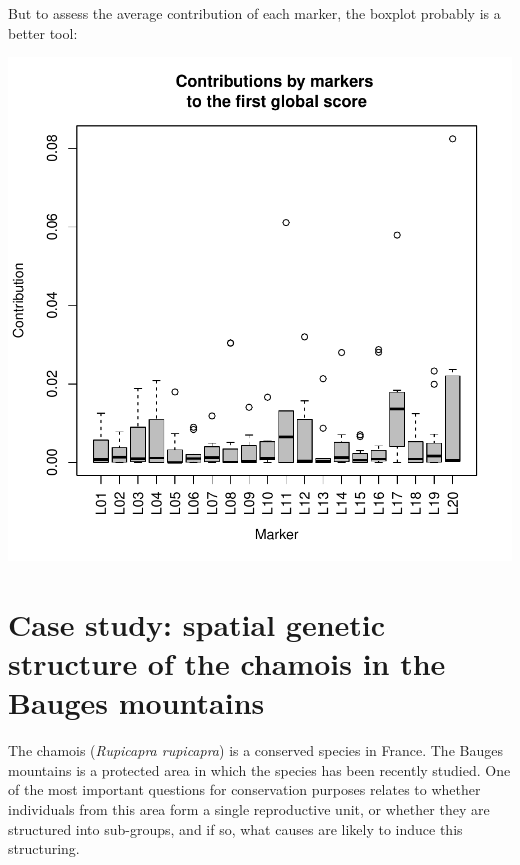 \documentclass{article}
\begin{document}
But to assess the average contribution of each marker, the
boxplot probably is a better tool:
\begin{Schunk}
\end{Schunk}
\includegraphics{figs/spca-boxplot}











\section{Case study: spatial genetic structure of the chamois in the Bauges mountains}
The chamois (\textit{Rupicapra rupicapra}) is a conserved species in France.
The Bauges mountains is a protected area in which the species has been
recently studied.
One of the most important questions for conservation purposes relates to whether individuals
from this area form a single reproductive unit, or whether they
are structured into sub-groups, and if so, what causes are likely to
induce this structuring.
\end{document}
